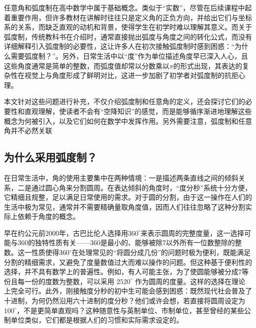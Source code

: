 

任意角和弧度制在高中数学中属于基础概念。类似于“实数”，尽管在后续课程中起着重要作用，但许多教材在讲解时往往只是定义角的正负方向，并给出它们与坐标系的关系，而缺乏直观的动机和背景，使得学生在初学时难以理解其意义。而关于弧度制，传统教科书在介绍时，通常直接抛出弧度与角度之间的转化公式，而没有详细解释引入弧度制的必要性，这让许多人在初次接触弧度制时感到困惑：“为什么需要弧度制？”。另外，日常生活中以“度”作为单位描述角度早已深入人心，且这些角度通常是简单的整数，而弧度值却常以分数乘以$\pi$的形式出现，其表达的复杂性在视觉上与角度形成了鲜明对比，这进一步加剧了初学者对弧度制的抗拒心理。

本文针对这些问题进行补充，不仅介绍弧度制和任意角的定义，还会探讨它们的必要性和直观理解，使读者不会有“空降知识”的感觉，而是能够循序渐进地理解这些概念为何被引入，以及它们如何在数学中发挥作用。另外需要注意，弧度制和任意角并不必然关联

\subsection{为什么采用弧度制？}

在日常生活中，角的使用主要集中在两种情境：一是描述两条直线之间的倾斜关系，二是通过圆心角来分割圆周。在表达倾斜的角度时，“度分秒”系统十分方便，它精细且规整，足以满足日常使用的需求。对于圆的分割，由于这一操作在人们的生活中极为常见，通常并不需要精确量取角度值，因而人们往往忽略了这种分割实际上依赖于角度的概念。

早在约公元前2000年，古巴比伦人选择用$360^\circ$来表示圆周的完整度量，这一选择可能与360的独特性质有关——360是最小的、能够被除7以外所有一位数整除的整数。这一性质使得$360^\circ$在处理常见的“将圆分成几份”的问题时极为便利，既能满足分割的精细需求，又避免了度量数值过大而难以操作的问题。但这种基于便利性的选择，并不具有数学上的普遍性。例如，有人可能主张，为了使圆能够被分成7等份且每一份的度数为整数，可以采用 $2520^\circ$ 作为圆周的度量。这样的选择在理论上完全可行。此外，刚接触度分秒的初中生可能会感到困惑：既然现代社会普及了十进制，为何仍然沿用六十进制的度分秒？他们或许会想，若直接将圆周设定为 $100^\circ$，不是更简单直观吗？这种随意性与英制单位、市制单位，甚至曾经的某些公制单位类似，它们都是根据人们的习惯和实际需求设定的。

